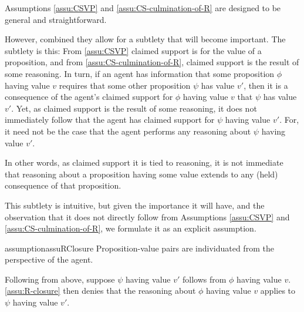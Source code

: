 \begin{note}
  Assumptions \ref{assu:CSVP} and \ref{assu:CS-culmination-of-R} are designed to be general and straightforward.

  However, combined they allow for a subtlety that will become important.
  The subtlety is this:
  From \autoref{assu:CSVP} claimed support is for the value of a proposition, and from \autoref{assu:CS-culmination-of-R}, claimed support is the result of some reasoning.
  In turn, if an agent has information that some proposition \(\phi\) having value \(v\) requires that some other proposition \(\psi\) has value \(v'\), then it is a consequence of the agent's claimed support for \(\phi\) having value \(v\) that \(\psi\) has value \(v'\).
  Yet, as claimed support is the result of some reasoning, it does not immediately follow that the agent has claimed support for \(\psi\) having value \(v'\).
  For, it need not be the case that the agent performs any reasoning about \(\psi\) having value \(v'\).

  In other words, as claimed support it is tied to reasoning, it is not immediate that reasoning about a proposition having some value extends to any (held) consequence of that proposition.

  This subtlety is intuitive, but given the importance it will have, and the observation that it does not directly follow from Assumptions \ref{assu:CSVP} and \ref{assu:CS-culmination-of-R}, we formulate it as an explicit assumption.
\end{note}

\begin{note}
  \begin{restatable}{assumption}{assuRClosure}
    \label{assu:R-closure}
    \label{assu:prop-indiv-by-ag}
    \label{assu:indication}
    {
      \color{red}
      Proposition-value pairs are individuated from the perspective of the agent.
    }
  \end{restatable}

  Following from above, suppose \(\psi\) having value \(v'\) follows from \(\phi\) having value \(v\).
  \autoref{assu:R-closure} then denies that the reasoning about \(\phi\) having value \(v\) applies to \(\psi\) having value \(v'\).
\end{note}

